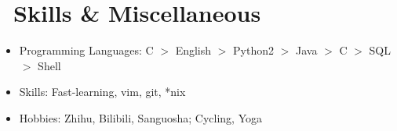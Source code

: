 \documentclass{resume}
\newcommand{\CC}{C\nolinebreak\hspace{-.05em}\raisebox{.4ex}{\tiny\bf +}\nolinebreak\hspace{-.10em}\raisebox{.4ex}{\tiny\bf +}}
\newcommand{\CS}{C\nolinebreak\hspace{-.05em}\raisebox{.6ex}{\scriptsize\bf{\#}}}
\begin{document}

\section{\faCogs\ Skills \& Miscellaneous}
\begin{itemize}[parsep=0.5ex]
  \item Programming Languages: \CC{} $>$ English $>$ Python2 
          	$>$ Java $>$ \CS{} $>$ SQL $>$ Shell
  \item Skills: Fast-learning, vim, git, *nix
  \item Hobbies: Zhihu, Bilibili, Sanguosha; Cycling, Yoga
\end{itemize}

% 

%
%
\end{document}
